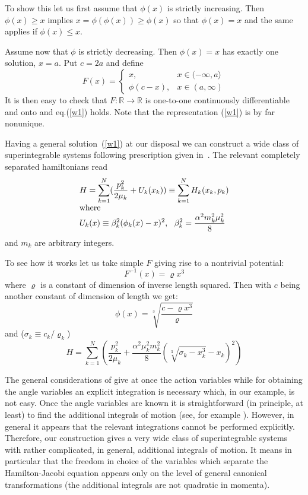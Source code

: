 \documentclass[a4paper,12pt]{article}
\newcommand{\mR}{{\mathbb R}}
\begin{document}
To show this let us first assume that $\phi(x)$  is strictly increasing. Then $\phi(x)\geq x$
implies $x=\phi(\phi(x))\geq\phi(x)$ so that $\phi(x)=x$ and the same applies if $\phi(x)\leq x$.

Assume now that $\phi$ is strictly decreasing. Then $\phi(x)=x$ has exactly one solution, $x=a$.
Put $c=2a$ and define 
\[
F(x)=\left\{
\begin{array}{ll}
x, & x\in(-\infty,a\rangle\\
\phi(c-x), & x\in(a,\infty)
\end{array}
\right.
\]
It is then easy to check that $F:\mR\rightarrow\mR$ is one-to-one continuously differentiable and onto and
eq.(\ref{w1}) holds. Note that the representation (\ref{w1}) is by far nonunique.

Having a general solution~(\ref{w1}) at our disposal we can construct a wide class of 
superintegrable systems following prescription given in~\cite{1}.
The relevant completely separated hamiltonians read
\begin{equation}
\begin{array}{l}
\displaystyle
H=\sum_{k=1}^N(\frac{p_k^2}{2\mu_k}+U_k(x_k))\equiv\sum_{k=1}^NH_k(x_k,p_k)\\
\displaystyle\mbox{\rm where}\\
\displaystyle U_k(x)\equiv\beta_k^2(\phi_k(x)-x)^2,\ \ \beta_k^2=\frac{\alpha^2m_k^2\mu_k^2}{8}
\end{array}
\label{w2}
\end{equation}
and  $m_k$ are arbitrary integers.

To see how it works let us take simple $F$ giving rise to a nontrivial potential:
\begin{equation}
F^{-1}(x)=\varrho x^3
\label{w3}
\end{equation}
where $\varrho$ is a constant of dimension of inverse length squared. Then with $c$ being another 
constant of dimension of length we get:
\begin{equation}
\phi(x)=\sqrt[3]{\displaystyle\frac{c-\varrho x^3}{\varrho}}
\label{w4}
\end{equation}
and ($\sigma_k\equiv c_k/\varrho_k$)
\begin{equation}
H=\sum_{k=1}^N(\frac{p_k^2}{2\mu_k}+\frac{\alpha^2\mu_k^2m_k^2}{8}(\sqrt[3]{\sigma_k-x_k^3}-x_k)^2)
\label{w5}
\end{equation}

The general considerations of \cite{1} give at once the action variables while for obtaining
 the angle variables an explicit integration is necessary which, in our example, is not easy. Once
the angle variables are known it is straightforward (in principle, at least) to find the additional 
integrals of motion (see, for example \cite{7,8}). However, in general it appears that 
the relevant integrations cannot be performed explicitly. Therefore, our construction gives a very
wide class of superintegrable systems with rather complicated, in general, additional integrals of motion.
It means in particular that the freedom in choice of the variables which separate the
Hamilton-Jacobi equation appears only on the level of general canonical transformations 
(the additional integrals are not quadratic in momenta).
\end{document}
